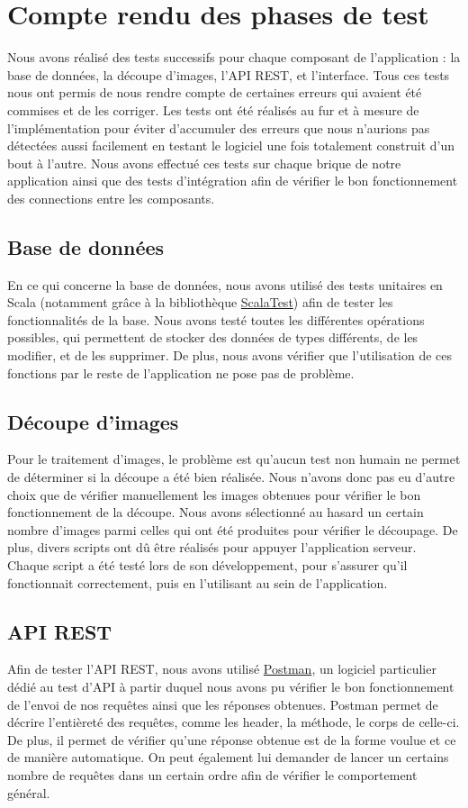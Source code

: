 \chapter{Compte rendu des phases de test}

Nous avons réalisé des tests successifs pour chaque composant de l'application : la base de données, la découpe d'images, l'API REST, et l'interface. Tous ces tests nous ont permis de nous rendre compte de certaines erreurs qui avaient été commises et de les corriger. Les tests ont été réalisés au fur et à mesure de l'implémentation pour éviter d'accumuler des erreurs que nous n'aurions pas détectées aussi facilement en testant le logiciel une fois totalement construit d'un bout à l'autre. Nous avons effectué ces tests sur chaque brique de notre application ainsi que des tests d'intégration afin de vérifier le bon fonctionnement des connections entre les composants.

\section{Base de données}
En ce qui concerne la base de données, nous avons utilisé des tests unitaires en Scala (notamment grâce à la bibliothèque \href{http://www.scalatest.org/}{ScalaTest}) afin de tester les fonctionnalités de la base. Nous avons testé toutes les différentes opérations possibles, qui permettent de stocker des données de types différents, de les modifier, et de les supprimer. De plus, nous avons vérifier que l'utilisation de ces fonctions par le reste de l'application ne pose pas de problème.

\section{Découpe d'images}
Pour le traitement d'images, le problème est qu'aucun test non humain ne permet de déterminer si la découpe a été bien réalisée. Nous n'avons donc pas eu d'autre choix que de vérifier manuellement les images obtenues pour vérifier le bon fonctionnement de la découpe. Nous avons sélectionné au hasard un certain nombre d'images parmi celles qui ont été produites pour vérifier le découpage. De plus, divers scripts ont dû être réalisés pour appuyer l'application serveur. Chaque script a été testé lors de son développement, pour s'assurer qu'il fonctionnait correctement, puis en l'utilisant au sein de l'application.

\section{API REST}
Afin de tester l'API REST, nous avons utilisé \href{https://www.getpostman.com/}{Postman}, un logiciel particulier dédié au test d'API à partir duquel nous avons pu vérifier le bon fonctionnement de l'envoi de nos requêtes ainsi que les réponses obtenues. Postman permet de décrire l'entièreté des requêtes, comme les header, la méthode, le corps de celle-ci. De plus, il permet de vérifier qu'une réponse obtenue est de la forme voulue et ce de manière automatique. On peut également lui demander de lancer un certains nombre de requêtes dans un certain ordre afin de vérifier le comportement général.

